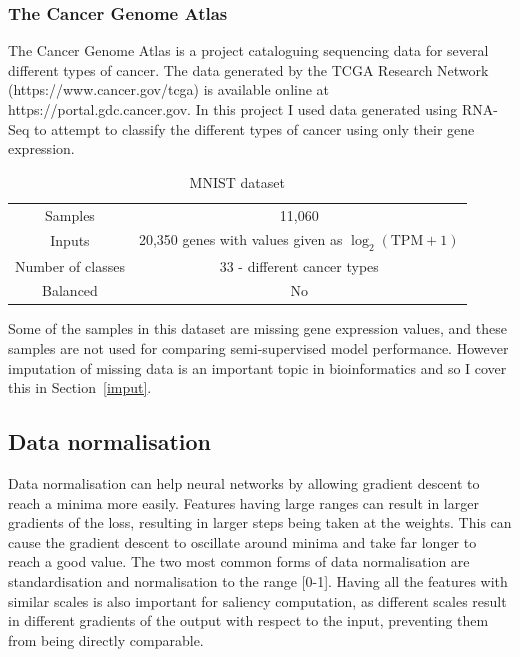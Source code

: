\documentclass[12pt,a4paper,twoside,openright]{report}
\begin{document}
\subsubsection{The Cancer Genome Atlas}
The Cancer Genome Atlas is a project cataloguing sequencing data for several different types of cancer. The data generated by the TCGA Research 
Network (https://www.cancer.gov/tcga) is available online at https://portal.gdc.cancer.gov. In this project I used data generated using 
RNA-Seq to attempt to classify the different types of cancer using only their gene expression.
\begin{table}[H]
  \label{tab:tcga}
  \small %
  \centering %
  \begin{tabular}{cc} %
  \toprule[\heavyrulewidth]
  Samples & 11,060 \\
  Inputs & 20,350 genes with values given as $\log_{2}(\text{TPM}+1)$ \footnotemark \\
  Number of classes & 33 - different cancer types\\
  Balanced & No \\
  \bottomrule[\heavyrulewidth] 
  \end{tabular}
  \caption{MNIST dataset} 
\end{table}

Some of the samples in this dataset are missing gene expression values, and these samples are not used for comparing semi-supervised model
performance. However imputation of missing data is an important topic in bioinformatics and so I cover this in Section~\ref{imput}.

\subsection{Data normalisation}
Data normalisation can help neural networks by allowing gradient descent to reach a minima more easily. Features having large ranges
can result in larger gradients of the loss, resulting in larger steps being taken at the weights. This can cause the 
gradient descent to oscillate around minima and take far longer to reach a good value. The two most common forms of data normalisation 
are standardisation and normalisation to the range [0-1]. Having all the features with similar scales is also important for saliency computation,
as different scales result in different gradients of the output with respect to the input, preventing them from being directly comparable.
\end{document}
